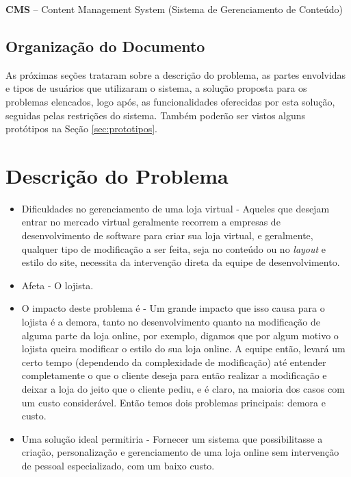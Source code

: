 \documentclass[a4paper,12pt]{monografia}
\begin{document}
\textbf{CMS} – Content Management System (Sistema de Gerenciamento de Conteúdo)

\subsection{Organização do Documento} %
\label{sec:organizacao_do_documento}

As próximas seções trataram sobre a descrição do problema, as partes envolvidas e tipos de usuários que utilizaram o sistema, a solução proposta para os problemas elencados, logo após, as funcionalidades oferecidas por esta solução, seguidas pelas restrições do sistema. Também poderão ser vistos alguns protótipos na Seção \ref{sec:prototipos}.


\section{Descrição do Problema} %
\label{cha:descricao_do_problema}

\begin{itemize}
\item Dificuldades no gerenciamento de uma loja virtual - 
Aqueles que desejam entrar no mercado virtual geralmente recorrem a empresas de desenvolvimento de software para criar sua loja virtual, e geralmente, qualquer tipo de modificação a ser feita, seja no conteúdo ou no \textit{layout} e estilo do site, necessita da intervenção direta da equipe de desenvolvimento.

\item Afeta - O lojista.
\item O impacto deste problema é - 
Um grande impacto que isso causa para o lojista é a demora, tanto no desenvolvimento quanto na modificação de alguma parte da loja online, por exemplo, digamos que por algum motivo o lojista queira modificar o estilo do sua loja online. A equipe então, levará um certo tempo (dependendo da complexidade de modificação) até entender completamente o que o cliente deseja para então realizar a modificação e deixar a loja do jeito que o cliente pediu, e é claro, na maioria dos casos com um custo considerável. Então temos dois problemas principais: demora e custo.

\item Uma solução ideal permitiria - 
Fornecer um sistema que possibilitasse a criação, personalização  e gerenciamento de uma loja online sem intervenção de pessoal especializado, com um baixo custo.

\end{itemize}
\end{document}
